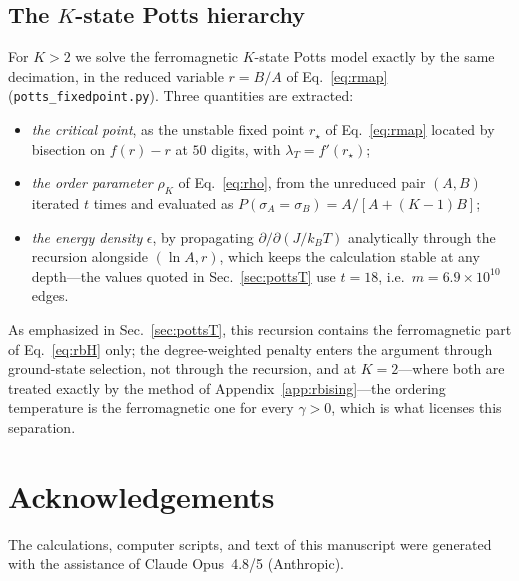 \documentclass[preprint,12pt]{elsarticle}
\begin{document}
\subsection{The $K$-state Potts hierarchy}
\label{app:potts}

For $K>2$ we solve the ferromagnetic $K$-state Potts model exactly by the
same decimation, in the reduced variable $r=B/A$ of Eq.~\eqref{eq:rmap}
(\texttt{potts\_fixedpoint.py}). Three quantities are extracted:
\begin{itemize}
\item \emph{the critical point}, as the unstable fixed point $r_\star$ of
      Eq.~\eqref{eq:rmap} located by bisection on $f(r)-r$ at $50$ digits, with
      $\lambda_T=f'(r_\star)$;
\item \emph{the order parameter} $\rho_K$ of Eq.~\eqref{eq:rho}, from the
      unreduced pair $(A,B)$ iterated $t$ times and evaluated as
      $P(\sigma_A=\sigma_B)=A/[A+(K{-}1)B]$;
\item \emph{the energy density} $\epsilon$, by propagating $\partial/\partial
      (J/k_BT)$ analytically through the recursion alongside $(\ln A,r)$, which
      keeps the calculation stable at any depth---the values quoted in
      Sec.~\ref{sec:pottsT} use $t=18$, i.e.\ $m=6.9\times10^{10}$ edges.
\end{itemize}
As emphasized in Sec.~\ref{sec:pottsT}, this recursion contains the
ferromagnetic part of Eq.~\eqref{eq:rbH} only; the degree-weighted penalty
enters the argument through ground-state selection, not through the recursion,
and at $K=2$---where both are treated exactly by the method of
Appendix~\ref{app:rbising}---the ordering temperature is the ferromagnetic one
for every $\gamma>0$, which is what licenses this separation.

\section*{Acknowledgements}
The calculations, computer scripts, and text of this manuscript were generated
with the assistance of Claude Opus~4.8/5 (Anthropic).

\vspace{4pt}


\end{document}
